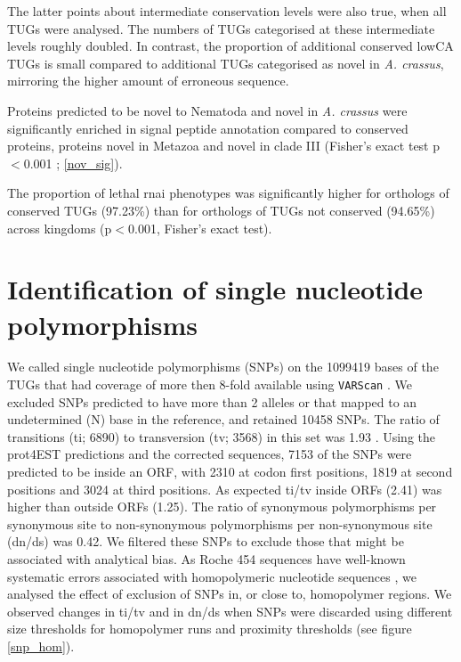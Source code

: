 The latter points about intermediate conservation levels were also
true, when all TUGs were analysed. The numbers of TUGs categorised at
these intermediate levels roughly doubled. In contrast, the proportion
of additional conserved lowCA TUGs is small compared to additional
TUGs categorised as novel in \textit{A. crassus}, mirroring the higher
amount of erroneous sequence.

Proteins predicted to be novel to Nematoda and novel in
\textit{A. crassus} were significantly enriched in signal peptide
annotation compared to conserved proteins, proteins novel in Metazoa
and novel in clade III (Fisher's exact test p$<$0.001 ;
\ref{nov_sig}).


The proportion of lethal rnai phenotypes was significantly higher for
orthologs of conserved TUGs (97.23\%) than for orthologs of TUGs not
conserved (94.65\%) across kingdoms (p$<$0.001, Fisher's exact test).

\section{Identification of single nucleotide polymorphisms}

We called single nucleotide polymorphisms (SNPs) on the 1099419 bases
of the TUGs that had coverage of more then 8-fold available using
\texttt{VARScan} \cite{pmid19542151}. We excluded SNPs predicted to
have more than 2 alleles or that mapped to an undetermined (N) base in
the reference, and retained 10458 SNPs. The ratio of transitions (ti;
6890) to transversion (tv; 3568) in this set was 1.93 . Using the
prot4EST predictions and the corrected sequences, 7153 of the SNPs
were predicted to be inside an ORF, with 2310 at codon first
positions, 1819 at second positions and 3024 at third positions. As
expected ti/tv inside ORFs (2.41) was higher than outside ORFs
(1.25). The ratio of synonymous polymorphisms per synonymous site to
non-synonymous polymorphisms per non-synonymous site (dn/ds) was
0.42. We filtered these SNPs to exclude those that might be associated
with analytical bias. As Roche 454 sequences have well-known
systematic errors associated with homopolymeric nucleotide sequences
\cite{pmid21685085}, we analysed the effect of exclusion of SNPs in,
or close to, homopolymer regions. We observed changes in ti/tv and in
dn/ds when SNPs were discarded using different size thresholds for
homopolymer runs and proximity thresholds (see figure \ref{snp_hom}).

